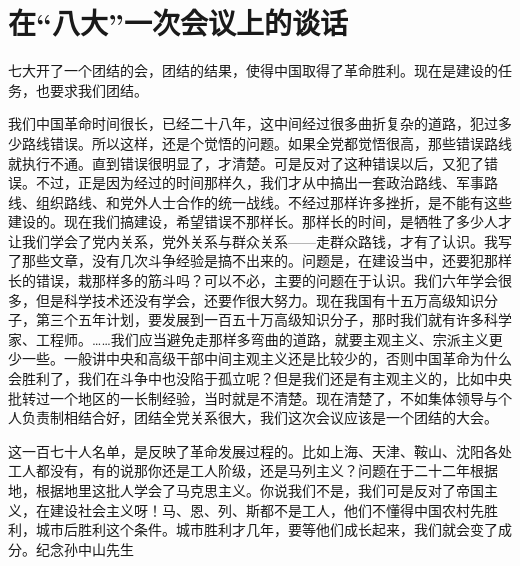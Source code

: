 \section[在“八大”一次会议上的谈话（一九五六年九月十日）]{在“八大”一次会议上的谈话}


七大开了一个团结的会，团结的结果，使得中国取得了革命胜利。现在是建设的任务，也要求我们团结。

我们中国革命时间很长，已经二十八年，这中间经过很多曲折复杂的道路，犯过多少路线错误。所以这样，还是个觉悟的问题。如果全党都觉悟很高，那些错误路线就执行不通。直到错误很明显了，才清楚。可是反对了这种错误以后，又犯了错误。不过，正是因为经过的时间那样久，我们才从中搞出一套政治路线、军事路线、组织路线、和党外人士合作的统一战线。不经过那样许多挫折，是不能有这些建设的。现在我们搞建设，希望错误不那样长。那样长的时间，是牺牲了多少人才让我们学会了党内关系，党外关系与群众关系——走群众路钱，才有了认识。我写了那些文章，没有几次斗争经验是搞不出来的。问题是，在建设当中，还要犯那样长的错误，栽那样多的筋斗吗？可以不必，主要的问题在于认识。我们六年学会很多，但是科学技术还没有学会，还要作很大努力。现在我国有十五万高级知识分子，第三个五年计划，要发展到一百五十万高级知识分子，那时我们就有许多科学家、工程师。……我们应当避免走那样多弯曲的道路，就要主观主义、宗派主义更少一些。一般讲中央和高级干部中间主观主义还是比较少的，否则中国革命为什么会胜利了，我们在斗争中也没陷于孤立呢？但是我们还是有主观主义的，比如中央批转过一个地区的一长制经验，当时就是不清楚。现在清楚了，不如集体领导与个人负责制相结合好，团结全党关系很大，我们这次会议应该是一个团结的大会。

这一百七十人名单，是反映了革命发展过程的。比如上海、天津、鞍山、沈阳各处工人都没有，有的说那你还是工人阶级，还是马列主义？问题在于二十二年根据地，根据地里这批人学会了马克思主义。你说我们不是，我们可是反对了帝国主义，在建设社会主义呀！马、恩、列、斯都不是工人，他们不懂得中国农村先胜利，城市后胜利这个条件。城市胜利才几年，要等他们成长起来，我们就会变了成分。纪念孙中山先生


